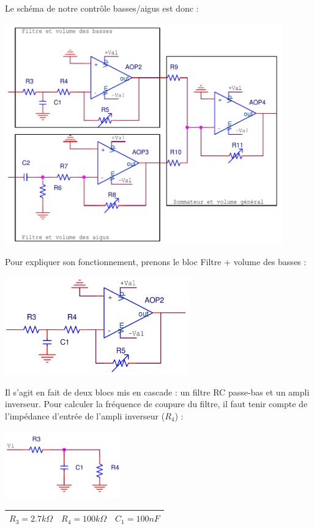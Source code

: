 \documentclass{../template/labo}
\begin{document}
Le schéma de notre contrôle basses/aigus est donc :
\begin{center}
\includegraphics[width=12cm]{figures/egaliseur_sommateur.png}
\end{center}

Pour expliquer son fonctionnement, prenons le bloc Filtre + volume des basses :
\begin{center}
\includegraphics[width=8cm]{figures/AOPfiltrebasse.png}
\end{center}

Il s'agit en fait de deux blocs mis en cascade : un filtre RC passe-bas et un ampli inverseur.
Pour calculer la fréquence de coupure du filtre, il faut tenir compte de l'impédance d'entrée de l'ampli inverseur ($R_4$) :
\begin{center}
\includegraphics[width=5cm]{figures/filter.png}

\begin{tabular}{|c||c||c|}\hline
$R_3 = 2.7 k\Omega$ & $R_4 = 100 k\Omega$ & $C_1 = 100 nF$ \\ \hline
\end{tabular}
\end{center}
\end{document}
